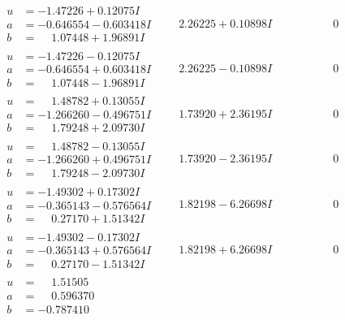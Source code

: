 \documentclass[1p]{elsarticle_modified}
\theoremstyle{definition}
\begin{document}
$$\begin{array}{c|c|c}
\begin{aligned}
u &= -1.47226 + 0.12075 I \\
a &= -0.646554 - 0.603418 I \\
b &= \phantom{-}1.07448 + 1.96891 I\end{aligned}
 & \phantom{-}2.26225 + 0.10898 I & \phantom{-0.000000 } 0 \\ \hline\begin{aligned}
u &= -1.47226 - 0.12075 I \\
a &= -0.646554 + 0.603418 I \\
b &= \phantom{-}1.07448 - 1.96891 I\end{aligned}
 & \phantom{-}2.26225 - 0.10898 I & \phantom{-0.000000 } 0 \\ \hline\begin{aligned}
u &= \phantom{-}1.48782 + 0.13055 I \\
a &= -1.266260 - 0.496751 I \\
b &= \phantom{-}1.79248 + 2.09730 I\end{aligned}
 & \phantom{-}1.73920 + 2.36195 I & \phantom{-0.000000 } 0 \\ \hline\begin{aligned}
u &= \phantom{-}1.48782 - 0.13055 I \\
a &= -1.266260 + 0.496751 I \\
b &= \phantom{-}1.79248 - 2.09730 I\end{aligned}
 & \phantom{-}1.73920 - 2.36195 I & \phantom{-0.000000 } 0 \\ \hline\begin{aligned}
u &= -1.49302 + 0.17302 I \\
a &= -0.365143 - 0.576564 I \\
b &= \phantom{-}0.27170 + 1.51342 I\end{aligned}
 & \phantom{-}1.82198 - 6.26698 I & \phantom{-0.000000 } 0 \\ \hline\begin{aligned}
u &= -1.49302 - 0.17302 I \\
a &= -0.365143 + 0.576564 I \\
b &= \phantom{-}0.27170 - 1.51342 I\end{aligned}
 & \phantom{-}1.82198 + 6.26698 I & \phantom{-0.000000 } 0 \\ \hline\begin{aligned}
u &= \phantom{-}1.51505\phantom{ +0.000000I} \\
a &= \phantom{-}0.596370\phantom{ +0.000000I} \\
b &= -0.787410\phantom{ +0.000000I}\end{aligned}

\end{array}$$
\end{document}
